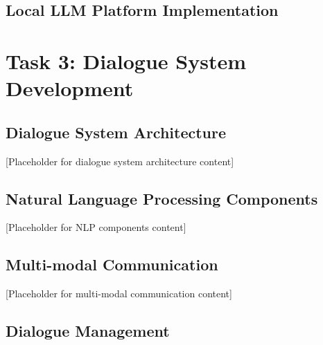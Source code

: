 \documentclass[12pt,a4paper]{article}
\begin{document}
\subsection{Local LLM Platform Implementation}



\section{Task 3: Dialogue System Development}


\subsection{Dialogue System Architecture}


[Placeholder for dialogue system architecture content]

\subsection{Natural Language Processing Components}


[Placeholder for NLP components content]

\subsection{Multi-modal Communication}


[Placeholder for multi-modal communication content]

\subsection{Dialogue Management}
\end{document}
